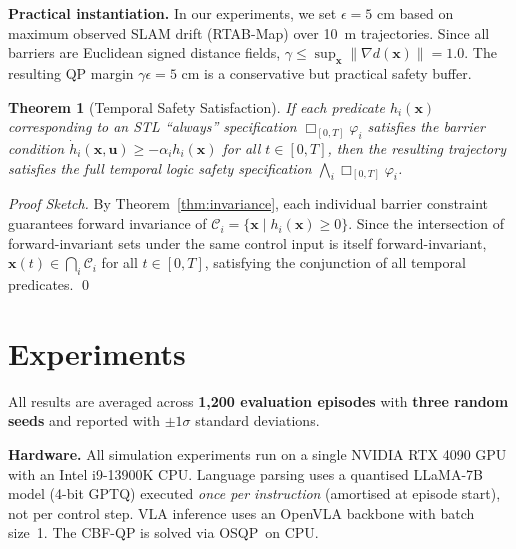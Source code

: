 \documentclass[conference]{IEEEtran}
\newtheorem{theorem}{Theorem}
\begin{document}
\noindent\textbf{Practical instantiation.} In our experiments, we set $\epsilon = 5$ cm based on maximum observed SLAM drift (RTAB-Map) over 10~m trajectories. Since all barriers are Euclidean signed distance fields, $\gamma \le \sup_{\mathbf{x}} \|\nabla d(\mathbf{x})\| = 1.0$. The resulting QP margin $\gamma \epsilon = 5$ cm is a conservative but practical safety buffer.

\begin{theorem}[Temporal Safety Satisfaction]
\label{thm:temporal}
If each predicate $h_i(\mathbf{x})$ corresponding to an STL ``always'' specification $\Box_{[0,T]} \varphi_i$ satisfies the barrier condition $\dot{h}_i(\mathbf{x}, \mathbf{u}) \ge -\alpha_i h_i(\mathbf{x})$ for all $t \in [0,T]$, then the resulting trajectory satisfies the full temporal logic safety specification $\bigwedge_i \Box_{[0,T]} \varphi_i$.
\end{theorem}
\begin{proof}[Proof Sketch]
By Theorem~\ref{thm:invariance}, each individual barrier constraint guarantees forward invariance of $\mathcal{C}_i = \{ \mathbf{x} \mid h_i(\mathbf{x}) \ge 0 \}$. Since the intersection of forward-invariant sets under the same control input is itself forward-invariant, $\mathbf{x}(t) \in \bigcap_i \mathcal{C}_i$ for all $t \in [0,T]$, satisfying the conjunction of all temporal predicates. \qed
\end{proof}

\section{Experiments}

All results are averaged across \textbf{1{,}200 evaluation episodes} with \textbf{three random seeds} and reported with $\pm 1\sigma$ standard deviations.

\noindent\textbf{Hardware.} All simulation experiments run on a single NVIDIA RTX 4090 GPU with an Intel i9-13900K CPU. Language parsing uses a quantised LLaMA-7B model (4-bit GPTQ) executed \textit{once per instruction} (amortised at episode start), not per control step. VLA inference uses an OpenVLA backbone with batch size~1. The CBF-QP is solved via OSQP~on CPU.
\end{document}
